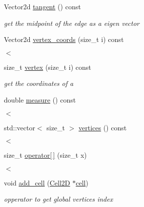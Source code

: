 \begin{DoxyCompactItemize}
Vector2d \hyperlink{classMeshFramework2D_1_1Edge2D_a033c6a0827f54b2adf059942d17468d6}{tangent} () const
\begin{DoxyCompactList}\small\item\em get the midpoint of the edge as a eigen vector \end{DoxyCompactList}\item 
Vector2d \hyperlink{classMeshFramework2D_1_1Edge2D_a8b6328521251ebaa45f217834d675c48}{vertex\+\_\+coords} (size\+\_\+t i) const
\begin{DoxyCompactList}\small\item\em $<$ \end{DoxyCompactList}\item 
size\+\_\+t \hyperlink{classMeshFramework2D_1_1Edge2D_a0f9b657399a3a61f1d92e4ea6ffae436}{vertex} (size\+\_\+t i) const
\begin{DoxyCompactList}\small\item\em get the coordinates of a \end{DoxyCompactList}\item 
double \hyperlink{classMeshFramework2D_1_1Edge2D_a31769e23163cddee4bacfdbd8278095b}{measure} () const
\begin{DoxyCompactList}\small\item\em $<$ \end{DoxyCompactList}\item 
std\+::vector$<$ size\+\_\+t $>$ \hyperlink{classMeshFramework2D_1_1Edge2D_a7343e846b9a43d408d8874b8322736fc}{vertices} () const
\begin{DoxyCompactList}\small\item\em $<$ \end{DoxyCompactList}\item 
size\+\_\+t \hyperlink{classMeshFramework2D_1_1Edge2D_ac403f3a34bba631bf97ede60979d9941}{operator\mbox{[}$\,$\mbox{]}} (size\+\_\+t x)
\begin{DoxyCompactList}\small\item\em $<$ \end{DoxyCompactList}\item 
void \hyperlink{classMeshFramework2D_1_1Edge2D_a206bd371085de27b2d404eef6c1cadae}{add\+\_\+cell} (\hyperlink{classMeshFramework2D_1_1Cell2D}{Cell2D} $\ast$\hyperlink{classMeshFramework2D_1_1Edge2D_aec9ba58af7a02bd31c4275edde79b5c6}{cell})
\begin{DoxyCompactList}\small\item\em opperator to get global vertices index \end{DoxyCompactList}\item 

\end{DoxyCompactItemize}
